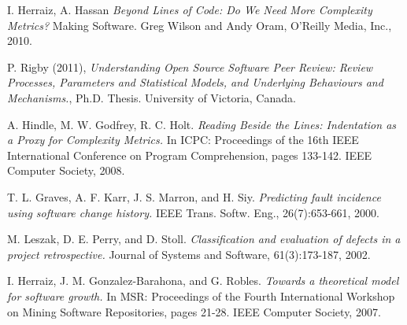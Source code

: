 \documentclass[9pt,twocolumn,a4paper]{article}
\begin{document}
\begin{thebibliography}{9}

I. Herraiz, A. Hassan  {\em Beyond Lines of Code: Do We Need More Complexity Metrics?} Making Software. Greg Wilson and Andy Oram,
  O'Reilly Media, Inc., 
  2010.
  
P. Rigby (2011), {\em Understanding Open Source Software Peer Review:
Review Processes, Parameters and Statistical Models, and
Underlying Behaviours and Mechanisms.},  
Ph.D. Thesis. University of Victoria, Canada.

A. Hindle, M. W. Godfrey, R. C. Holt. {\em Reading Beside the Lines: Indentation as a Proxy for Complexity Metrics.} In ICPC: Proceedings of the 16th IEEE International
Conference on Program Comprehension, pages 133-142. IEEE Computer Society,
2008.


T. L. Graves, A. F. Karr, J. S. Marron, and H. Siy. {\em Predicting fault incidence using
software change history.} IEEE Trans. Softw. Eng., 26(7):653-661, 2000.

M. Leszak, D. E. Perry, and D. Stoll. { \em Classification and evaluation of defects in a
project retrospective.} Journal of Systems and Software, 61(3):173-187, 2002.

I. Herraiz, J. M. Gonzalez-Barahona, and G. Robles. { \em Towards a theoretical model
for software growth.} In MSR: Proceedings of the Fourth International Workshop on
Mining Software Repositories, pages 21-28. IEEE Computer Society, 2007.




\end{thebibliography}
\end{document}
